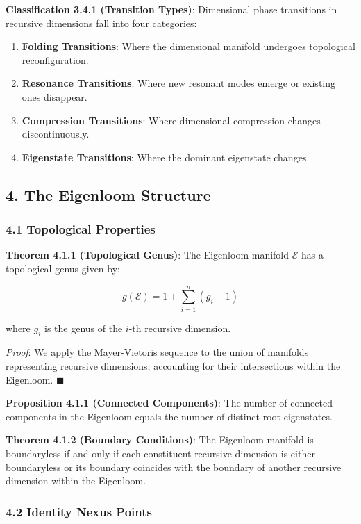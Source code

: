 \documentclass[
]{article}
\providecommand{\tightlist}{%
  \setlength{\itemsep}{0pt}\setlength{\parskip}{0pt}}
\begin{document}
\textbf{Classification 3.4.1 (Transition Types)}: Dimensional phase
transitions in recursive dimensions fall into four categories:

\begin{enumerate}
\def\labelenumi{\arabic{enumi}.}
\tightlist
\item
  \textbf{Folding Transitions}: Where the dimensional manifold undergoes
  topological reconfiguration.
\item
  \textbf{Resonance Transitions}: Where new resonant modes emerge or
  existing ones disappear.
\item
  \textbf{Compression Transitions}: Where dimensional compression
  changes discontinuously.
\item
  \textbf{Eigenstate Transitions}: Where the dominant eigenstate
  changes.
\end{enumerate}

\subsection{4. The Eigenloom Structure}\label{the-eigenloom-structure}

\subsubsection{4.1 Topological Properties}\label{topological-properties}

\textbf{Theorem 4.1.1 (Topological Genus)}: The Eigenloom manifold
\(\mathcal{E}\) has a topological genus given by:

\[g(\mathcal{E}) = 1 + \sum_{i=1}^{n} (g_i - 1)\]

where \(g_i\) is the genus of the \(i\)-th recursive dimension.

\emph{Proof}: We apply the Mayer-Vietoris sequence to the union of
manifolds representing recursive dimensions, accounting for their
intersections within the Eigenloom. \(\blacksquare \)

\textbf{Proposition 4.1.1 (Connected Components)}: The number of
connected components in the Eigenloom equals the number of distinct root
eigenstates.

\textbf{Theorem 4.1.2 (Boundary Conditions)}: The Eigenloom manifold is
boundaryless if and only if each constituent recursive dimension is
either boundaryless or its boundary coincides with the boundary of
another recursive dimension within the Eigenloom.

\subsubsection{4.2 Identity Nexus Points}\label{identity-nexus-points}
\end{document}
